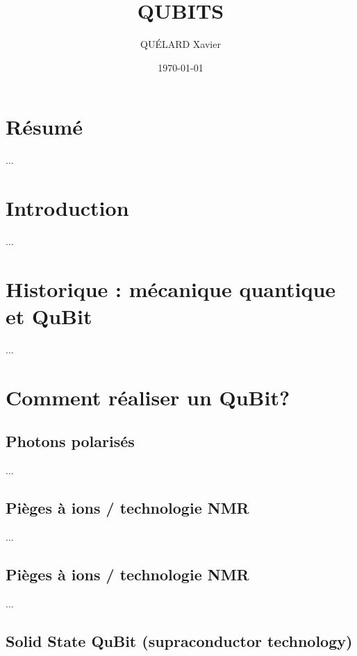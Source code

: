 \documentclass[a4paper,12pt]{report}
\title{QUBITS}
\author{QUÉLARD Xavier}
\date{ \today{} }
\newcommand{\para}[1]{\par{#1}\\}
\begin{document}
%
%

%
\maketitle

\chapter*{Résumé}

\para{
	...
}

\tableofcontents

\chapter*{Introduction}

\para{
	...
}

\chapter{Historique : mécanique quantique et QuBit}

\para{
	...
}

\chapter{Comment réaliser un QuBit?}
	\section{Photons polarisés}

\para{
	...
}

	\section{Pièges à ions / technologie NMR}

\para{
	...
}

	\section{Pièges à ions / technologie NMR}

\para{
...
}

	\section{Solid State QuBit (supraconductor technology)}
\end{document}
